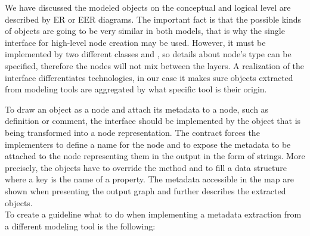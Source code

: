 We have discussed the modeled objects on the conceptual and logical level are described by ER or EER diagrams. 
The important fact is that the possible kinds of objects are going to be very similar in both models, that is why the single interface  for high-level node creation may be used.
However, it must be implemented by two different classes  and , so details about node's type can be specified, therefore the nodes will not mix between the layers.
A realization of the  interface differentiates technologies, in our case it makes sure objects extracted from modeling tools are aggregated by what specific tool is their origin.

To draw an object as a node and attach its metadata to a node, such as definition or comment, the  interface should be implemented by the object that is being transformed into a node representation.
The contract forces the implementers to define a name for the node and to expose the metadata to be attached to the node representing them in the output in the form of strings. 
More precisely, the objects have to override the  method and to fill a  data structure where a key is the name of a property. 
The metadata accessible in the map are shown when presenting the output graph and further describes the extracted objects. \\ 

To create a guideline what to do when implementing a metadata extraction from a different modeling tool is the following:

